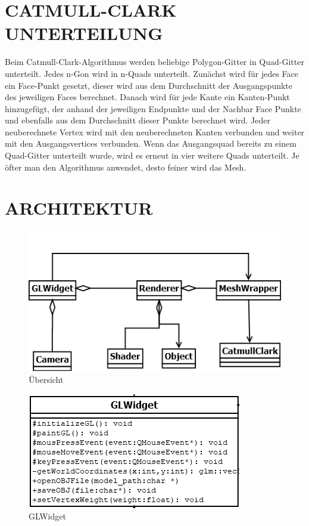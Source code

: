 	\section{\Large CATMULL-CLARK UNTERTEILUNG}
	Beim Catmull-Clark-Algorithmus werden beliebige Polygon-Gitter in Quad-Gitter unterteilt. Jedes n-Gon wird in n-Quads unterteilt. Zunächst wird für jedes Face ein Face-Punkt gesetzt, dieser wird aus dem Durchschnitt der Ausgangspunkte des jeweiligen Faces berechnet. Danach wird für jede Kante ein Kanten-Punkt hinzugefügt, der anhand der jeweiligen Endpunkte und der Nachbar Face Punkte und ebenfalls aus dem Durchschnitt dieser Punkte berechnet wird. Jeder neuberechnete Vertex wird mit den neuberechneten Kanten verbunden und weiter mit den Ausgangsvertices verbunden. Wenn das Ausgangsquad bereits zu einem Quad-Gitter unterteilt wurde, wird es erneut in vier weitere Quads unterteilt. Je öfter man den Algorithmus anwendet, desto feiner wird das Mesh.

	\section{\Large ARCHITEKTUR}
	
	\begin{figure}[H]
	\centering
	\includegraphics[width=0.7\linewidth]{uebersicht.png}
	\caption{Übersicht}
	\label{fig1}
	\end{figure}

	\begin{figure}[H]
	\centering
	\includegraphics[width=0.7\linewidth]{GLWidget.png}
	\caption{GLWidget}
	\label{fig2}
	\end{figure}
	
